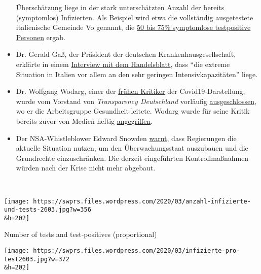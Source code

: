 \begin{itemize}
  Überschätzung liege in der stark unterschätzten Anzahl der bereits
  (symptomlos) Infizierten. Als Beispiel wird etwa die vollständig
  ausgetestete italienische Gemeinde Vo genannt, die
  \href{https://www.repubblica.it/salute/medicina-e-ricerca/2020/03/16/news/coronavirus_studio_il_50-75_dei_casi_a_vo_sono_asintomatici_e_molto_contagiosi-251474302/}{50
  bis 75\% symptomlose testpositive Personen} ergab.
\item
  Dr. Gerald Gaß, der Präsident der deutschen Krankenhausgesellschaft,
  erklärte in einem
  \href{https://www.handelsblatt.com/politik/deutschland/coronakrise-deutsche-krankenhausgesellschaft-wir-sind-besser-vorbereitet-als-italien/25651268.html}{Interview
  mit dem Handelsblatt}, dass ``die extreme Situation in Italien vor
  allem an den sehr geringen Intensivkapazitäten'' liege.
\item
  Dr. Wolfgang Wodarg, einer der
  \href{https://www.youtube.com/watch?v=p_AyuhbnPOI}{frühen Kritiker}
  der Covid19-Darstellung, wurde vom Vorstand von \emph{Transparency
  Deutschland} vorläufig
  \href{https://www.transparency.de/aktuelles/detail/article/in-eigener-sache-vorstand-beschliesst-ruhen-der-mitgliedschaft-von-wolfgang-wodarg-1/}{ausgeschlossen},
  wo er die Arbeitsgruppe Gesundheit leitete. Wodarg wurde für seine
  Kritik bereits zuvor von Medien heftig
  \href{https://www.youtube.com/watch?v=xcirqmhBCvk}{angegriffen}.
\item
  Der NSA-Whistleblower Edward Snowden
  \href{https://www.futurezone.de/digital-life/article228779795/Gefaehrliche-weltweite-Entwicklung-Edward-Snowden-warnt-vor-Ueberwachung.html}{warnt},
  dass Regierungen die aktuelle Situation nutzen, um den
  Überwachungsstaat auszubauen und die Grundrechte einzuschränken. Die
  derzeit eingeführten Kontrollmaßnahmen würden nach der Krise nicht
  mehr abgebaut.
\end{itemize}

~

\href{https://swprs.org/a-swiss-doctor-on-covid-19/anzahl-infizierte-und-tests-2603/}{}

\texttt{[image: https://swprs.files.wordpress.com/2020/03/anzahl-infizierte-und-tests-2603.jpg?w=356\\\&h=202]}

Number of tests and test-positives (proportional)

\href{https://swprs.org/covid-19-hinweis-ii/infizierte-pro-test2603/}{}

\texttt{[image: https://swprs.files.wordpress.com/2020/03/infizierte-pro-test2603.jpg?w=372\\\&h=202]}

